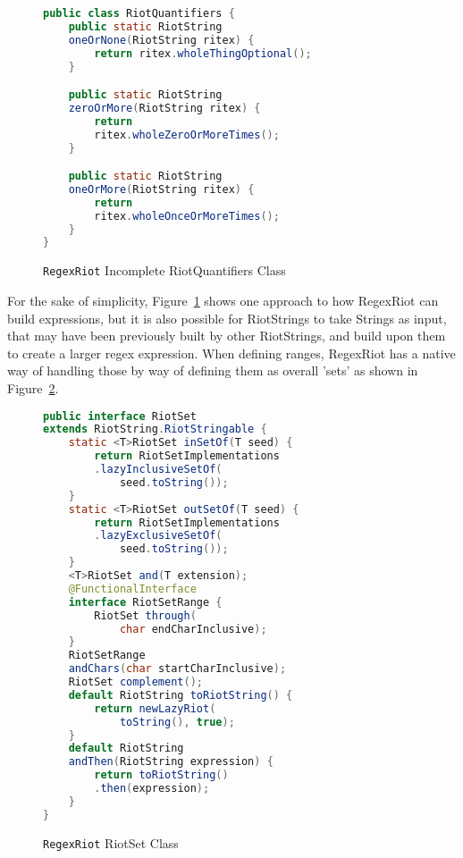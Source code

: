 \documentclass[conference]{IEEEtran}
\begin{document}
\begin{figure}[htbp]
    \centering
    \label{fig:regexriot-quantifiers}
    \begin{lstlisting}[language=Java]
public class RiotQuantifiers {
    public static RiotString 
    oneOrNone(RiotString ritex) {
        return ritex.wholeThingOptional();
    }

    public static RiotString 
    zeroOrMore(RiotString ritex) {
        return 
        ritex.wholeZeroOrMoreTimes();
    }

    public static RiotString 
    oneOrMore(RiotString ritex) {
        return 
        ritex.wholeOnceOrMoreTimes();
    }
}
    \end{lstlisting}
    \caption{\texttt{RegexRiot} Incomplete RiotQuantifiers Class}
\end{figure}

For the sake of simplicity, Figure~\ref{fig:regexriot-quantifiers} shows one approach to how
RegexRiot can build expressions, but it is also possible for RiotStrings
to take Strings as input, that may have been previously built by other
RiotStrings, and build upon them to create a larger regex expression.
When defining ranges, RegexRiot has a native way of handling those by way
of defining them as overall 'sets' as shown in Figure~\ref{fig:regexriot-riotset}.

\begin{figure}[htbp]
    \centering
    \label{fig:regexriot-riotset}
    \begin{lstlisting}[language=Java]
public interface RiotSet 
extends RiotString.RiotStringable {
    static <T>RiotSet inSetOf(T seed) {
        return RiotSetImplementations
        .lazyInclusiveSetOf(
            seed.toString());
    }
    static <T>RiotSet outSetOf(T seed) {
        return RiotSetImplementations
        .lazyExclusiveSetOf(
            seed.toString());
    }
    <T>RiotSet and(T extension);
    @FunctionalInterface
    interface RiotSetRange {
        RiotSet through(
            char endCharInclusive);
    }
    RiotSetRange 
    andChars(char startCharInclusive);
    RiotSet complement();
    default RiotString toRiotString() {
        return newLazyRiot(
            toString(), true);
    }
    default RiotString 
    andThen(RiotString expression) {
        return toRiotString()
        .then(expression);
    }
}
    \end{lstlisting}
    \caption{\texttt{RegexRiot} RiotSet Class}
\end{figure}
\end{document}
